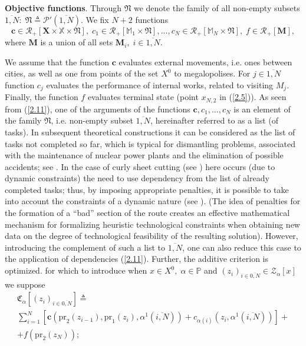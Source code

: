 \documentclass[numbers,sort&compress]{IntechOpen-Book}%
\begin{document}
{\bf Objective functions}.
Through $\mathfrak{N}$
we denote the family of all non-empty subsets
$\overline{1,N}:\;\mathfrak{N} {\triangleq}  \mathcal{P}'(\overline{1,N})$.
We fix $ N + 2 $ functions
\begin{equation}\label{2.11}
  \mathbf{c} \in \mathcal{R}_+[\mathbf{X} \times \mathbb{X} \times \mathfrak{N}],\;
  c_1 \in \mathcal{R}_+[\mathbb{M}_1 \times \mathfrak{N}],...,
  c_N \in \mathcal{R}_+[\mathbb{M}_N \times \mathfrak{N}],\;
  f \in \mathcal{R}_+[\mathbf{M}],
\end{equation}
where $\mathbf{M}$
is a union of all sets
$\mathbf{M}_i,\;i \in \overline{1,N}$.

We assume that the function
$\mathbf{c}$
evaluates external movements,
i.e. ones between cities,
as well as one from points of the set $ X ^ 0 $
to megalopolises.
For $j \in \overline{1,N}$
function $ c_j $
evaluates the performance of internal works,
related to visiting $ M_j$.
Finally, the function $ f $
evaluates terminal state
(point $x_{N,2}$
in  (\ref{2.5})).
As seen from  (\ref{2.11}),
one of the arguments of the functions
$ \mathbf {c}, c_1, ..., c_N $
is an element of the family $\mathfrak{N}$,
i.e. non-empty subset $\overline{1, N}$,
hereinafter referred to as a list (of tasks).
In subsequent theoretical constructions
it can be considered as
the list of tasks
not completed so far,
which is typical for dismantling problems,
associated with the maintenance of nuclear power plants
and the elimination of possible accidents;
see \cite{1,3}.
In the case of curly sheet cutting
(see \cite{4})
here occurs
(due to dynamic constraints)
the need to use dependency
from the list of already completed tasks;
thus, by imposing appropriate penalties,
it is possible to take into account the constraints of a dynamic nature
(see \cite{18}).
(The idea of penalties
for the formation of a ``bad''
section of the route
creates an effective mathematical mechanism
for formalizing heuristic technological constraints
when obtaining new data on the degree of technological feasibility
of the resulting solution).
However, introducing the complement of such a list to
$\overline{1,N}$,
one can also reduce this case to the application of dependencies
 (\ref{2.11}).
Further, the additive criterion is optimized.
for which to introduce
when
$x \in X^0,\;\alpha \in \mathbb{P}$
and
$(z_i)_{i \in \overline{0,N}} \in \mathcal{Z}_\alpha[x]$
we suppose
\begin{multline}\label{2.12}
\mathfrak{C}_{\alpha}[(z_i)_{i \in \overline{0,N}}] {\triangleq}
\\
\sum\limits_{i=1}^N [\mathbf{c}(\mathrm{pr}_2(z_{i-1}),\mathrm{pr}_1(z_i),\alpha^1(\overline{i,N})) +
c_{\alpha(i)}(z_i,\alpha^1(\overline{i,N}))] +
\\
+ f(\mathrm{pr}_2(z_N));
\end{multline}
\end{document}

